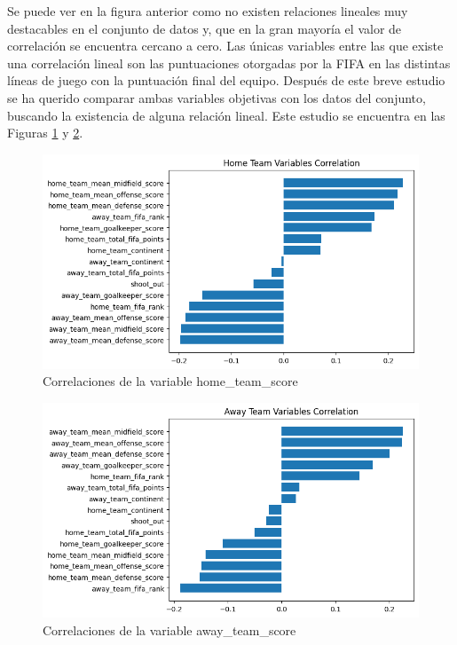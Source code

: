 Se puede ver en la figura anterior como no existen relaciones lineales muy destacables en el conjunto de datos y, que en la gran mayoría el valor de correlación se encuentra cercano a cero. Las únicas variables entre las que existe una correlación lineal son las puntuaciones otorgadas por la FIFA en las distintas líneas de juego con la puntuación final del equipo. Después de este breve estudio se ha querido comparar ambas variables objetivas con los datos del conjunto, buscando la existencia de alguna relación lineal. Este estudio se encuentra en las Figuras \ref{Conjunto-Datos-Home-Correlaciones} y \ref{Conjunto-Datos-Away-Correlaciones}.

\begin{figure}[H]
    \centering
    \includegraphics[width=\smallSize]{images/homeTeamCorrelation.png}
    \caption{Correlaciones de la variable home\_team\_score}
    \label{Conjunto-Datos-Home-Correlaciones}
\end{figure}

\begin{figure}[H]
    \centering
    \includegraphics[width=\smallSize]{images/awayTeamCorrelation.png}
    \caption{Correlaciones de la variable away\_team\_score}
    \label{Conjunto-Datos-Away-Correlaciones}
\end{figure}

